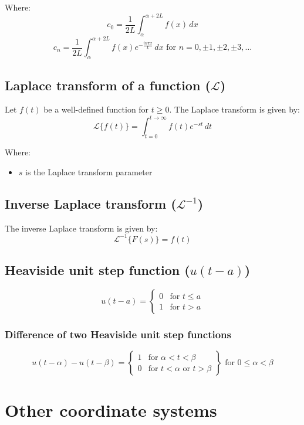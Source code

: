 \documentclass[11pt]{article}
\begin{document}
Where:
\[c_0 = \frac{1}{2L} \int_{\alpha}^{\alpha + 2L} f(x) \, dx\]
\[c_n = \frac{1}{2L} \int_{\alpha}^{\alpha + 2L} f(x) e^{- \frac{i n \pi x}{L}} \, dx \text{ for } n = 0, \pm 1, \pm 2, \pm 3, \ldots \]
\subsection{Laplace transform of a function (\(\mathcal{L}\))}
\label{sec:orgb4a697c}
Let \(f(t)\) be a well-defined function for \(t \ge 0\). The Laplace transform is given by:
\[\mathcal{L} \{ f(t) \} = \int_{t = 0}^{t \rightarrow \infty} f(t) e^{-st} \, dt\]

Where:
\begin{itemize}
\item \(s\) is the Laplace transform parameter
\end{itemize}
\subsection{Inverse Laplace transform (\(\mathcal{L}^{-1}\))}
\label{sec:orgc1574fe}
The inverse Laplace transform is given by:
\[\mathcal{L}^{-1} \{ F(s) \} = f(t)\]
\subsection{Heaviside unit step function (\(u(t - a)\))}
\label{sec:orgf20bc93}
\label{orgfaf877c}
\begin{displaymath}
u(t - a) = \begin{cases}
0 & \text{for } t \le a \\
1 & \text{for } t > a
\end{cases}
\end{displaymath}
\subsubsection{Difference of two Heaviside unit step functions}
\label{sec:orge176afd}
\begin{displaymath}
u(t - \alpha) - u(t - \beta) = \left. \begin{cases}
1 & \text{for } \alpha < t < \beta \\
0 & \text{for } t < \alpha \text{ or } t > \beta
\end{cases} \right\} \text{ for } 0 \le \alpha < \beta
\end{displaymath}

 \newpage
\section{Other coordinate systems}
\label{sec:org51c5c4a}
\end{document}
